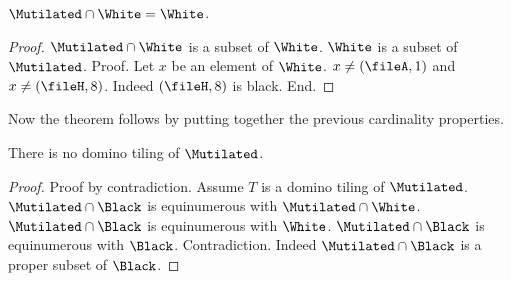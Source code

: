 \begin{forthel}
    \begin{lemma}
        $\Mutilated \cap \White = \White$.
    \end{lemma}
    \begin{proof}
        $\Mutilated \cap \White$ is a subset of $\White$.
        $\White$ is a subset of $\Mutilated$.
        Proof.
            Let $x$ be an element of $\White$.
            $x \neq (\fileA, 1)$ and $x \neq (\fileH,8)$.
            Indeed $(\fileH, 8)$ is black.
        End.
    \end{proof}
\end{forthel}

\noindent Now the theorem follows by putting together the previous cardinality properties.

\begin{forthel}
    \begin{theorem}
        There is no domino tiling of $\Mutilated$.
    \end{theorem}
    \begin{proof}
        Proof by contradiction.
        Assume $T$ is a domino tiling of $\Mutilated$.
        $\Mutilated \cap \Black$ is equinumerous with $\Mutilated \cap \White$.
        $\Mutilated \cap \Black$ is equinumerous with $\White$.
        $\Mutilated \cap \Black$ is equinumerous with $\Black$.
        Contradiction. Indeed $\Mutilated \cap \Black$ is a proper subset of $\Black$.
    \end{proof}
\end{forthel}
